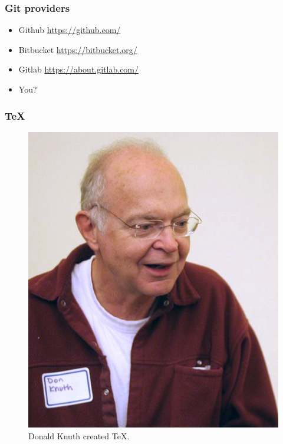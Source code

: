 \documentclass{beamer}
\begin{document}
\begin{frame}
\frametitle{Git providers}
\begin{itemize}
\item Github \url{https://github.com/}
\item Bitbucket \url{https://bitbucket.org/}
\item Gitlab \url{https://about.gitlab.com/}
\item You?
\end{itemize}
\end{frame}

\begin{frame}
\frametitle{TeX}
\begin{figure}[t]
  \includegraphics[scale = 0.3]{Donald_Knuth.png}
\caption{Donald Knuth created TeX.}
\end{figure}
\end{frame}
\end{document}
